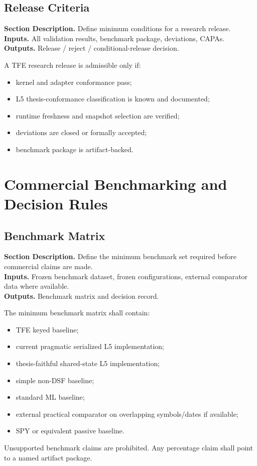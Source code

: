 \documentclass[11pt]{report}
\newcommand{\meta}[3]{\textbf{Section Description.} #1\\
\textbf{Inputs.} #2\\
\textbf{Outputs.} #3\par}
\begin{document}
\section{Release Criteria}
\meta{Define minimum conditions for a research release.}{All validation results, benchmark package, deviations, CAPAs.}{Release / reject / conditional-release decision.}

A TFE research release is admissible only if:
\begin{itemize}
    \item kernel and adapter conformance pass;
    \item L5 thesis-conformance classification is known and documented;
    \item runtime freshness and snapshot selection are verified;
    \item deviations are closed or formally accepted;
    \item benchmark package is artifact-backed.
\end{itemize}

\chapter{Commercial Benchmarking and Decision Rules}
\section{Benchmark Matrix}
\meta{Define the minimum benchmark set required before commercial claims are made.}{Frozen benchmark dataset, frozen configurations, external comparator data where available.}{Benchmark matrix and decision record.}

The minimum benchmark matrix shall contain:
\begin{itemize}
    \item TFE keyed baseline;
    \item current pragmatic serialized L5 implementation;
    \item thesis-faithful shared-state L5 implementation;
    \item simple non-DSF baseline;
    \item standard ML baseline;
    \item external practical comparator on overlapping symbols/dates if available;
    \item SPY or equivalent passive baseline.
\end{itemize}

Unsupported benchmark claims are prohibited. Any percentage claim shall point to a named artifact package.
\end{document}
